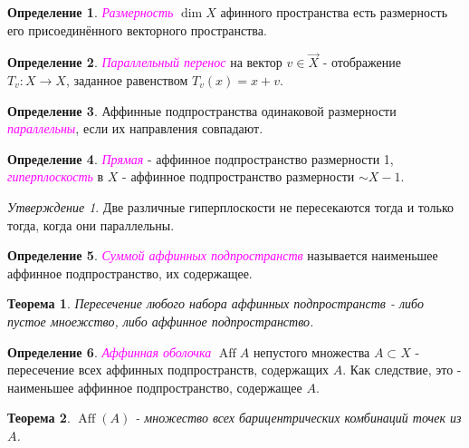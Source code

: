 \documentclass[a4paper,100pt]{article}
\theoremstyle{indented}
\newtheorem{theorem}{Теорема}
\theoremstyle{definition}
\newtheorem{defn}{Определение}
\theoremstyle{remark}
\newtheorem{stat}{Утверждение}
\DeclareMathOperator{\ra}{\rightarrow}
\DeclareMathOperator{\Aff}{Aff}
\begin{document}
\begin{defn}
    \textit{\textcolor{magenta}{\hypertarget{s15}{Размерность}}} $\dim X$ афинного пространства есть размерность его присоединённого векторного пространства.
\end{defn}

\begin{defn}
    \textit{\textcolor{magenta}{\hypertarget{s16}{Параллельный перенос}}} на вектор $v\in \vec{X}$ - отображение $T_v:X\ra X$, заданное равенством $T_v(x)=x+v$. 
\end{defn}

\begin{defn}
    Аффинные подпространства одинаковой размерности \textit{\textcolor{magenta}{\hypertarget{s17}{параллельны}}}, если их направления совпадают.
\end{defn}

\begin{defn}
    \textit{\textcolor{magenta}{\hypertarget{s18}{Прямая}}} - аффинное подпространство размерности 1, \textit{\textcolor{magenta}{\hypertarget{s19}{гиперплоскость}}} в $X$ - аффинное подпространство размерности $\sim X - 1$. 
\end{defn}

\begin{stat}
    Две различные гиперплоскости не пересекаются тогда и только тогда, когда они параллельны.
\end{stat}

\begin{defn}
    \textit{\textcolor{magenta}{\hypertarget{s20}{Суммой аффинных подпространств}}} называется наименьшее аффинное подпространство, их содержащее.
\end{defn}

\begin{theorem}
    Пересечение любого набора аффинных подпространств - либо пустое мноежство, либо аффинное подпространство.
\end{theorem}

\begin{defn}
    \textit{\textcolor{magenta}{\hypertarget{s21}{Аффинная оболочка}}} $\Aff{A}$ непустого множества $A\subset X$ - пересечение всех аффинных подпространств, содержащих $A$. Как следствие, это - наименьшее аффинное подпространство, содержащее $A$. 
\end{defn}

\begin{theorem}
    $\Aff(A)$ - множество всех барицентрических комбинаций точек из $A$. 
\end{theorem}
\end{document}
